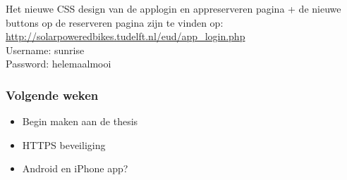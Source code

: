 \noindent Het nieuwe CSS design van de applogin en appreserveren pagina + de nieuwe buttons op de reserveren pagina zijn te vinden op:\\ \url{http://solarpoweredbikes.tudelft.nl/eud/app_login.php}\\

\noindent Username: sunrise\\
\noindent Password: helemaalmooi\\


\subsubsection*{Volgende weken}
\begin{itemize}
\item Begin maken aan de thesis
\item HTTPS beveiliging
\item Android en iPhone app?
\end{itemize}